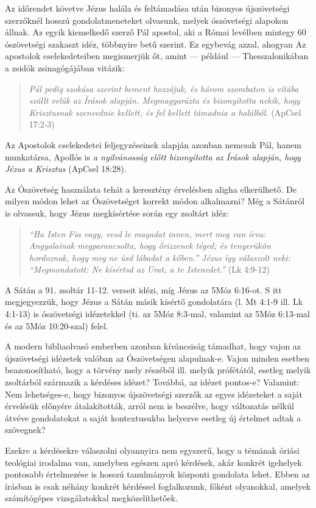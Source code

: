 \documentclass{article}
\begin{document}
Az időrendet követve Jézus halála és feltámadása után bizonyos újszövetségi szerzőknél hosszú gondolatmeneteket olvasunk,
melyek ószövetségi alapokon állnak. Az egyik kiemelkedő szerző Pál apostol, aki a Római levélben
mintegy 60 ószövetségi szakaszt idéz, többnyire betű szerint. Ez egybevág azzal, ahogyan
Az apostolok cselekedeteiben megismerjük őt, amint --- például --- Thesszalonikában a zsidók zsinagógájában
vitázik:
\begin{quote}
\textit{Pál pedig szokása szerint bement hozzájuk, és három szombaton is vitába
szállt velük az Írások alapján. Megmagyarázta és bizonyította nekik, hogy
Krisztusnak szenvednie kellett, és fel kellett támadnia a halálból.} (ApCsel 17:2-3)
\end{quote}
Az Apostolok cselekedetei feljegyzéseinek alapján azonban nemcsak Pál, hanem munkatársa,
Apollós is \textit{a nyilvánosság előtt bizonyította az Írások alapján, hogy Jézus a Krisztus}
(ApCsel 18:28). 

Az Ószövetség használata tehát a keresztény érvelésben aligha elkerülhető. De milyen módon lehet
az Ószövetséget korrekt módon alkalmazni? Még a Sátánról is olvassuk, hogy Jézus megkísértése
során egy zsoltárt idéz: 
\begin{quote}
\textit{``Ha Isten Fia vagy, vesd le magadat innen, mert meg van írva:
Angyalainak megparancsolta, hogy őrizzenek téged; 
és tenyerükön hordoznak, hogy meg ne üsd lábadat a kőben.''
Jézus így válaszolt neki: ``Megmondatott: Ne kísértsd az Urat, a te Istenedet.''} (Lk 4:9-12)
\end{quote}
A Sátán a 91. zsoltár 11-12. verseit idézi, míg Jézus az 5Móz 6:16-ot. S itt megjegyezzük,
hogy Jézus a Sátán másik kísértő gondolatára (l. Mt 4:1-9 ill. Lk 4:1-13) is ószövetségi idézetekkel
(ti. az 5Móz 8:3-mal, valamint az 5Móz 6:13-mal és az 5Móz 10:20-szal) felel.

A modern bibliaolvasó emberben azonban kíváncsiság támadhat, hogy vajon az újszövetségi idézetek
valóban az Ószövetségen alapulnak-e. Vajon minden esetben beazonosítható, hogy a törvény mely
részéből ill. melyik prófétától, esetleg melyik zsoltárból származik a kérdéses idézet?
Továbbá, az idézet pontos-e? Valamint: Nem lehetséges-e, hogy bizonyos újszövetségi szerzők az egyes
idézeteket a saját érvelésük előnyére átalakították, arról nem is beszélve, hogy változatás
nélkül átvéve gondolatokat a saját kontextusukba helyezve esetleg új értelmet adtak a szövegnek?

Ezekre a kérdésekre válaszolni olyannyira nem egyszerű, hogy a témának óriási teológiai irodalma
van, amelyben egészen apró kérdések, akár konkrét igehelyek pontosabb értelmezése is
hosszú tanulmányok központi gondolata lehet. Ebben az írásban is csak néhány konkrét kérdéssel
foglalkozunk, főként olyanokkal, amelyek számítógépes vizsgálatokkal megközelíthetőek.
\end{document}
